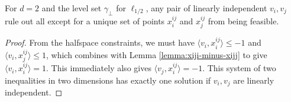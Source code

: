 \documentclass[anon]{colt2020} %
\newcommand{\inprod}[2]{\langle #1, #2 \rangle}%
\begin{document}
\begin{lemma} \label{lemma:unique-spot-xiji}
  For $d=2$ and the level set $\gamma_\bot$ for $\ell_{1/2}$, any pair of linearly independent $v_i,v_j$ rule out all except for a unique set of points $x^{ij}_i$ and $x^{ij}_j$ from being feasible.
\end{lemma}
\begin{proof}
  From the halfspace constraints, we must have $\inprod{v_i}{x^{ij}_i} \leq -1$ and $\inprod{v_i}{x^{ij}_j} \leq 1$, which combines with Lemma \ref{lemma:xiji-minus-xijj} to give $\inprod{v_i}{x^{ij}_i} = 1$.
  This immediately also gives $\inprod{v_j}{x^{ij}_i} = -1$.
  This system of two inequalities in two dimensions has exactly one solution if $v_i,v_j$ are linearly independent.
\end{proof}
\end{document}
